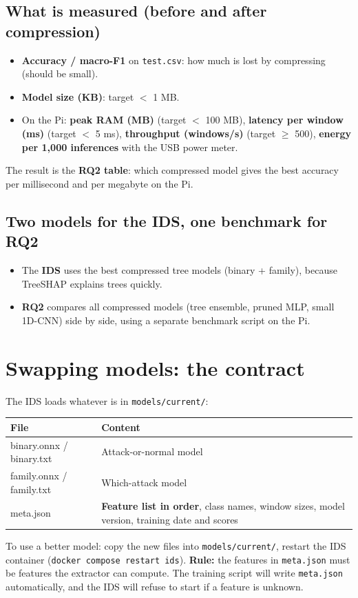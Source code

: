 \documentclass[11pt]{article}
\begin{document}
\subsection*{What is measured (before and after compression)}
\begin{itemize}
\item \textbf{Accuracy / macro-F1} on \texttt{test.csv}: how much is lost by compressing (should be small).
\item \textbf{Model size (KB)}: target $<$ 1 MB.
\item On the Pi: \textbf{peak RAM (MB)} (target $<$ 100 MB), \textbf{latency per window (ms)} (target $<$ 5 ms),
\textbf{throughput (windows/s)} (target $\geq$ 500), \textbf{energy per 1,000 inferences} with the USB power meter.
\end{itemize}
The result is the \textbf{RQ2 table}: which compressed model gives the best accuracy per millisecond and per megabyte on the Pi.

\subsection*{Two models for the IDS, one benchmark for RQ2}
\begin{itemize}
\item The \textbf{IDS} uses the best compressed tree models (binary + family), because TreeSHAP explains trees quickly.
\item \textbf{RQ2} compares all compressed models (tree ensemble, pruned MLP, small 1D-CNN) side by side, using a separate benchmark script on the Pi.
\end{itemize}

\newpage
\section{Swapping models: the contract}
The IDS loads whatever is in \texttt{models/current/}:
\begin{center}
\begin{tabular}{@{}>{\ttfamily}l >{\raggedright\arraybackslash}p{10.5cm}@{}}
\toprule
\textrm{\textbf{File}} & \textbf{Content} \\
\midrule
binary.onnx / binary.txt & Attack-or-normal model \\
family.onnx / family.txt & Which-attack model \\
meta.json & \textbf{Feature list in order}, class names, window sizes, model version, training date and scores \\
\bottomrule
\end{tabular}
\end{center}
To use a better model: copy the new files into \texttt{models/current/}, restart the IDS container (\texttt{docker compose restart ids}).
\textbf{Rule:} the features in \texttt{meta.json} must be features the extractor can compute. The training script will write \texttt{meta.json}
automatically, and the IDS will refuse to start if a feature is unknown.
\end{document}
